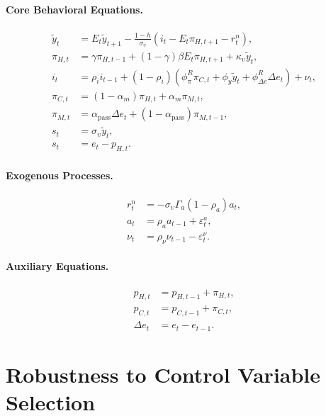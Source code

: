 \documentclass[12pt,a4paper]{article}
\begin{document}
\begin{appendices}
\paragraph{Core Behavioral Equations.}
\begin{align}
	\tilde{y}_t &= E_t\tilde{y}_{t+1} - \frac{1-h}{\sigma_\upsilon}(i_t - E_t\pi_{H,t+1} - r_t^n), \tag{IS} \\
	\pi_{H,t} &= \gamma\pi_{H,t-1} + (1-\gamma)\beta E_t\pi_{H,t+1} + \kappa_\upsilon\tilde{y}_t, \tag{NKPC} \\
	i_t &= \rho_i i_{t-1} + (1-\rho_i)(\phi_\pi^R\pi_{C,t} + \phi_y\tilde{y}_t + \phi_{\Delta e}^R\Delta e_t) + \nu_t, \tag{Taylor} \\
	\pi_{C,t} &= (1-\alpha_m)\pi_{H,t} + \alpha_m\pi_{M,t}, \tag{CPI} \\
	\pi_{M,t} &= \alpha_{\text{pass}}\Delta e_t + (1-\alpha_{\text{pass}})\pi_{M,t-1}, \tag{Import} \\
	s_t &= \sigma_\upsilon\tilde{y}_t, \tag{ToT} \\
	s_t &= e_t - p_{H,t}. \tag{ER def}
\end{align}

\paragraph{Exogenous Processes.}
\begin{align}
	r_t^n &= -\sigma_\upsilon\Gamma_a(1-\rho_a)a_t, \tag{Natural rate} \\
	a_t &= \rho_a a_{t-1} + \varepsilon_t^a, \tag{Technology} \\
	\nu_t &= \rho_\nu\nu_{t-1} - \varepsilon_t^\nu. \tag{Policy shock}
\end{align}

\paragraph{Auxiliary Equations.}
\begin{align}
	p_{H,t} &= p_{H,t-1} + \pi_{H,t}, \tag{Domestic prices} \\
	p_{C,t} &= p_{C,t-1} + \pi_{C,t}, \tag{CPI level} \\
	\Delta e_t &= e_t - e_{t-1}. \tag{ER change}
\end{align}

\newpage
\section{Robustness to Control Variable Selection}
\label{app:robustness_controls}


\end{appendices}
\end{document}
